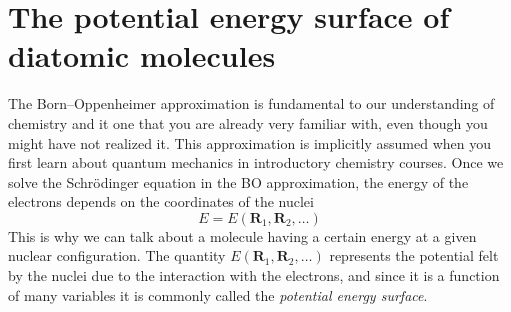 \documentclass[../Main/chem371-notes.tex]{subfiles}
\begin{document}
\section{The potential energy surface of diatomic molecules}

The Born--Oppenheimer approximation is fundamental to our understanding of chemistry and  it one that you are already very familiar with, even though you might have not realized it.
This approximation is implicitly assumed when you first learn about quantum mechanics in introductory chemistry courses.
Once we solve the Schr\"{o}dinger equation in the BO approximation, the energy of the electrons depends on the coordinates of the nuclei
\begin{equation}
E = E(\mathbf{R}_1,  \mathbf{R}_2,\ldots)
\end{equation}
This is why we can talk about a molecule having a certain energy at a given nuclear configuration.
The quantity $E(\mathbf{R}_1,  \mathbf{R}_2,\ldots)$ represents the potential felt by the nuclei due to the interaction with the electrons, and since it is a function of many variables it is commonly called the \emph{potential energy surface}.
\end{document}
